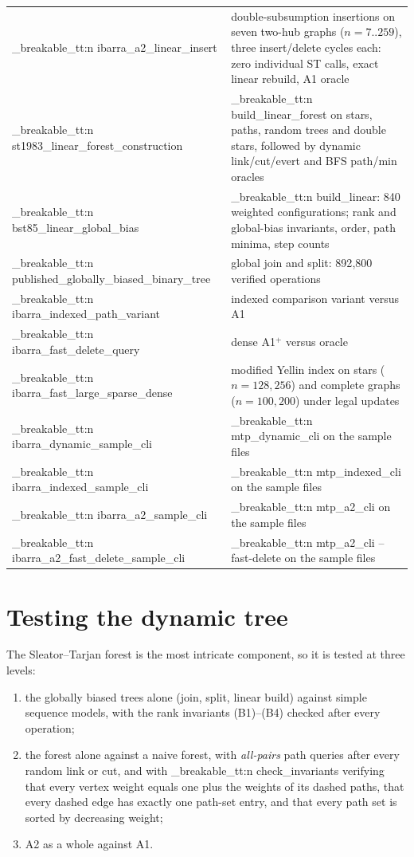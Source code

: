 \documentclass[11pt,a4paper,oneside]{report}
\theoremstyle{plain}
\theoremstyle{definition}
\theoremstyle{remark}
\DeclareRobustCommand{\code}[1]{\mtp_breakable_tt:n {#1}}
\begin{document}
\begin{longtable}{@{}>{\raggedright\arraybackslash}p{}>{\raggedright\arraybackslash}p{}@{}}
\code{ibarra_a2_linear_insert} & double-subsumption insertions on seven two-hub graphs (\(n=7..259\)), three insert/delete cycles each: zero individual ST calls, exact linear rebuild, A1 oracle\\
\code{st1983_linear_forest_construction} & \code{build_linear_forest} on stars, paths, random trees and double stars, followed by dynamic link/cut/evert and BFS path/min oracles\\
\code{bst85_linear_global_bias} & \code{build_linear}: 840 weighted configurations; rank and global-bias invariants, order, path minima, step counts\\
\code{published_globally_biased_binary_tree} & global join and split: 892{,}800 verified operations\\
\code{ibarra_indexed_path_variant} & indexed comparison variant versus A1\\
\code{ibarra_fast_delete_query} & dense A1\(^+\) versus oracle\\
\code{ibarra_fast_large_sparse_dense} & modified Yellin index on stars (\(n=128,256\)) and complete graphs (\(n=100,200\)) under legal updates\\
\code{ibarra_dynamic_sample_cli} & \code{mtp_dynamic_cli} on the sample files\\
\code{ibarra_indexed_sample_cli} & \code{mtp_indexed_cli} on the sample files\\
\code{ibarra_a2_sample_cli} & \code{mtp_a2_cli} on the sample files\\
\code{ibarra_a2_fast_delete_sample_cli} & \code{mtp_a2_cli --fast-delete} on the sample files\\
\end{longtable}

\section{Testing the dynamic tree}\label{sec:tests-st}
The Sleator--Tarjan forest is the most intricate component, so it is tested at three levels:
\begin{enumerate}
\item the globally biased trees alone (join, split, linear build) against simple sequence
  models, with the rank invariants (B1)--(B4) checked after every operation;
\item the forest alone against a naive forest, with \emph{all-pairs} path queries after every
  random link or cut, and with \code{check_invariants} verifying that every vertex weight equals
  one plus the weights of its dashed paths, that every dashed edge has exactly one path-set
  entry, and that every path set is sorted by decreasing weight;
\item A2 as a whole against A1.
\end{enumerate}
\end{document}
